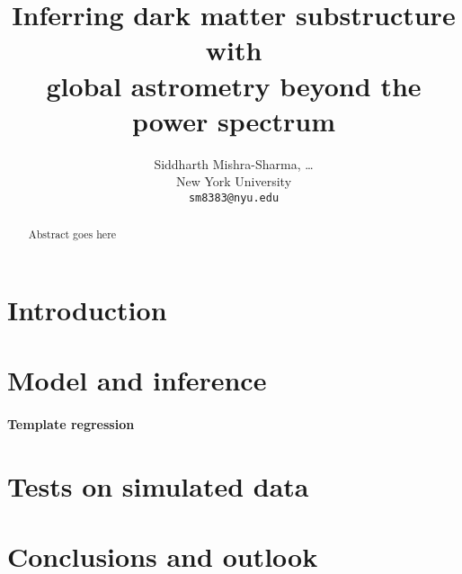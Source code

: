 \documentclass[]{article}
\title{Inferring dark matter substructure with \\ global astrometry beyond the power spectrum}
\author{
Siddharth Mishra-Sharma, \ldots \\
New York University \\
\texttt{sm8383@nyu.edu} \\
}
\begin{document}
\maketitle

\begin{abstract}
Abstract goes here 
\end{abstract}

\section{Introduction}
\label{sec:intro}


\section{Model and inference}
\label{sec:model}

\paragraph{Template regression}


\section{Tests on simulated data}
\label{sec:experiments}


\section{Conclusions and outlook}
\label{sec:conclusions}
\end{document}
